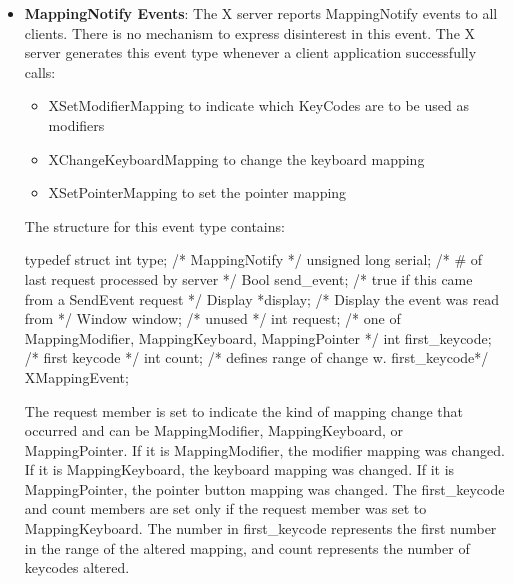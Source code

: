 \documentclass{report}
\begin{document}
\begin{itemize}
\begin{cppcode}
            \end{cppcode}
            \bigbreak \noindent 
            The event member is set either to the unmapped window or to its parent, depending on whether StructureNotify or SubstructureNotify was selected. This is the window used by the X server to report the event. The window member is set to the window that was unmapped. The from\_configure member is set to True if the event was generated as a result of a resizing of the window’s parent when the window itself had a win\_gravity of UnmapGravity
        \item \textbf{MappingNotify Events}: The X server reports MappingNotify events to all clients. There is no mechanism to express disinterest in this event. The X server generates this event type whenever a client application successfully calls:
            \begin{itemize}
                \item XSetModifierMapping to indicate which KeyCodes are to be used as modifiers
                \item XChangeKeyboardMapping to change the keyboard mapping
                \item XSetPointerMapping to set the pointer mapping
            \end{itemize}
            The structure for this event type contains:
            \bigbreak \noindent 
            \begin{cppcode}
                typedef struct {
                    int type;               /* MappingNotify */
                    unsigned long serial;   /* # of last request processed by server */
                    Bool send_event;        /* true if this came from a SendEvent request */
                    Display *display;       /* Display the event was read from */
                    Window window;          /* unused */
                    int request;            /* one of MappingModifier, MappingKeyboard,
                    MappingPointer */
                    int first_keycode;      /* first keycode */
                    int count;              /* defines range of change w. first_keycode*/
                } XMappingEvent;
            \end{cppcode}
            \bigbreak \noindent 
            The request member is set to indicate the kind of mapping change that occurred and can be MappingModifier, MappingKeyboard, or MappingPointer. If it is MappingModifier, the modifier mapping was changed. If it is MappingKeyboard, the keyboard mapping was changed. If it is MappingPointer, the pointer button mapping was changed. The first\_keycode and count members are set only if the request member was set to MappingKeyboard. The number in first\_keycode represents the first number in the range of the altered mapping, and count represents the number of keycodes altered.

\end{itemize}
\end{document}
